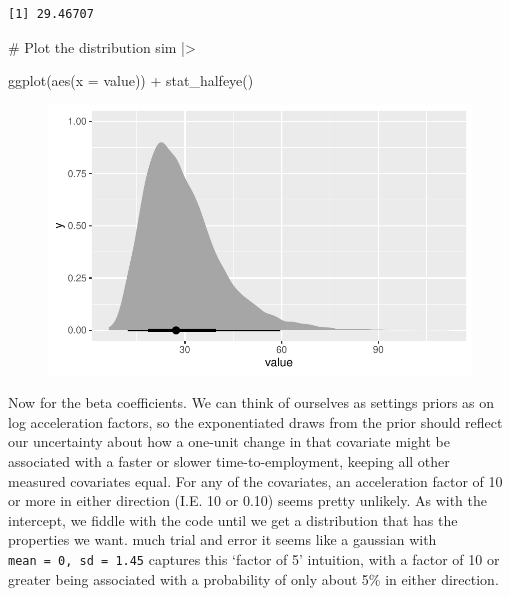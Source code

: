 \documentclass[
  letterpaper,
  DIV=11,
  numbers=noendperiod]{scrreprt}
\newenvironment{Shaded}{\begin{snugshade}}{\end{snugshade}}
\newcommand{\AttributeTok}[1]{\textcolor[rgb]{0.40,0.45,0.13}{#1}}
\newcommand{\CommentTok}[1]{\textcolor[rgb]{0.37,0.37,0.37}{#1}}
\newcommand{\FunctionTok}[1]{\textcolor[rgb]{0.28,0.35,0.67}{#1}}
\newcommand{\NormalTok}[1]{\textcolor[rgb]{0.00,0.23,0.31}{#1}}
\newcommand{\SpecialCharTok}[1]{\textcolor[rgb]{0.37,0.37,0.37}{#1}}
\begin{document}
\begin{verbatim}
[1] 29.46707
\end{verbatim}

\begin{Shaded}
\begin{Highlighting}[]
\CommentTok{\# Plot the distribution}
\NormalTok{sim }\SpecialCharTok{|\textgreater{}}

    \FunctionTok{ggplot}\NormalTok{(}\FunctionTok{aes}\NormalTok{(}\AttributeTok{x =}\NormalTok{ value)) }\SpecialCharTok{+}
    \FunctionTok{stat\_halfeye}\NormalTok{()  }
\end{Highlighting}
\end{Shaded}

\begin{figure}[H]

{\centering \includegraphics{./bayesian-cfa_files/figure-pdf/unnamed-chunk-24-1.pdf}

}

\end{figure}

Now for the beta coefficients. We can think of ourselves as settings
priors as on log acceleration factors, so the exponentiated draws from
the prior should reflect our uncertainty about how a one-unit change in
that covariate might be associated with a faster or slower
time-to-employment, keeping all other measured covariates equal. For any
of the covariates, an acceleration factor of 10 or more in either
direction (I.E. 10 or 0.10) seems pretty unlikely. As with the
intercept, we fiddle with the code until we get a distribution that has
the properties we want. much trial and error it seems like a gaussian
with \texttt{mean\ =\ 0,\ sd\ =\ 1.45} captures this `factor of 5'
intuition, with a factor of 10 or greater being associated with a
probability of only about 5\% in either direction.
\end{document}
